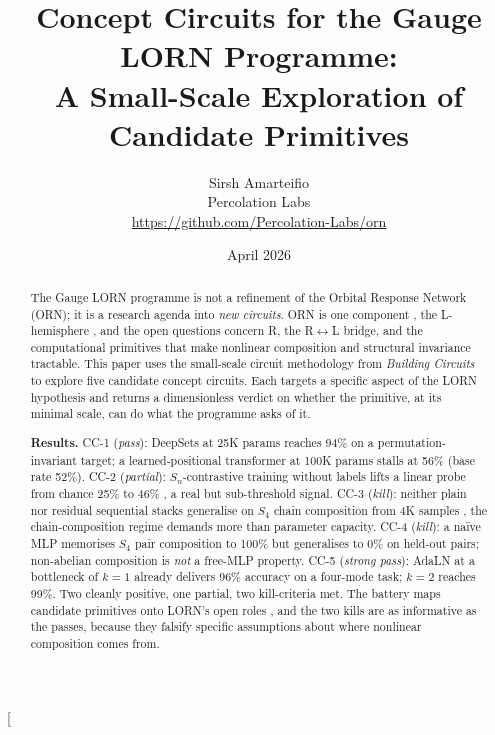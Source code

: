 \documentclass[10pt, twocolumn, a4paper]{article}
\title{\vspace{-1cm}\textbf{Concept Circuits for the Gauge LORN Programme:\\
A Small-Scale Exploration of Candidate Primitives}}
\author{%
    Sirsh Amarteifio\\
    {\small Percolation Labs}\\
    {\small \url{https://github.com/Percolation-Labs/orn}}%
}
\date{April 2026}
\newcommand{\Sn}{S_n}
\begin{document}
\twocolumn[\maketitle
\begin{abstract}
\noindent
The Gauge LORN programme is not a refinement of the Orbital Response Network (ORN); it is a research agenda into \emph{new circuits}. ORN is one component ,  the L-hemisphere ,  and the open questions concern R, the R$\leftrightarrow$L bridge, and the computational primitives that make nonlinear composition and structural invariance tractable. This paper uses the small-scale circuit methodology from \emph{Building Circuits} to explore five candidate concept circuits. Each targets a specific aspect of the LORN hypothesis and returns a dimensionless verdict on whether the primitive, at its minimal scale, can do what the programme asks of it.

\textbf{Results.} CC-1 (\emph{pass}): DeepSets at 25K params reaches 94\% on a permutation-invariant target; a learned-positional transformer at 100K params stalls at 56\% (base rate 52\%). CC-2 (\emph{partial}): $\Sn$-contrastive training without labels lifts a linear probe from chance 25\% to 46\% ,  a real but sub-threshold signal. CC-3 (\emph{kill}): neither plain nor residual sequential stacks generalise on $S_4$ chain composition from 4K samples ,  the chain-composition regime demands more than parameter capacity. CC-4 (\emph{kill}): a naïve MLP memorises $S_4$ pair composition to 100\% but generalises to 0\% on held-out pairs; non-abelian composition is \emph{not} a free-MLP property. CC-5 (\emph{strong pass}): AdaLN at a bottleneck of $k=1$ already delivers 96\% accuracy on a four-mode task; $k=2$ reaches 99\%. Two cleanly positive, one partial, two kill-criteria met. The battery maps candidate primitives onto LORN's open roles ,  and the two kills are as informative as the passes, because they falsify specific assumptions about where nonlinear composition comes from.
\end{abstract}\vspace{0.5cm}
\end{document}
